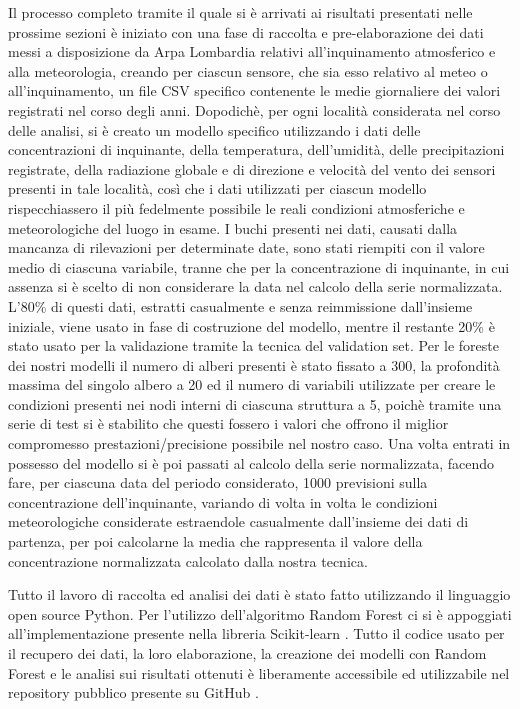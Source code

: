 \documentclass[a4paper,12pt]{report}
\begin{document}
Il processo completo tramite il quale si è arrivati ai risultati presentati nelle prossime sezioni è iniziato con una fase di raccolta e pre-elaborazione dei dati messi a disposizione da Arpa Lombardia relativi all'inquinamento atmosferico e alla meteorologia, creando per ciascun sensore, che sia esso relativo al meteo o all'inquinamento, un file CSV specifico contenente le medie giornaliere dei valori registrati nel corso degli anni. Dopodichè, per ogni località considerata nel corso delle analisi, si è creato un modello specifico utilizzando i dati delle concentrazioni di inquinante, della temperatura, dell'umidità, delle precipitazioni registrate, della radiazione globale e di direzione e velocità del vento dei sensori presenti in tale località, così che i dati utilizzati per ciascun modello rispecchiassero il più fedelmente possibile le reali condizioni atmosferiche e meteorologiche del luogo in esame. I buchi presenti nei dati, causati dalla mancanza di rilevazioni per determinate date, sono stati riempiti con il valore medio di ciascuna variabile, tranne che per la concentrazione di inquinante, in cui assenza si è scelto di non considerare la data nel calcolo della serie normalizzata. L'80\% di questi dati, estratti casualmente e senza reimmissione dall'insieme iniziale, viene usato in fase di costruzione del modello, mentre il restante 20\% è stato usato per la validazione tramite la tecnica del validation set. Per le foreste dei nostri modelli il numero di alberi presenti è stato fissato a 300, la profondità massima del singolo albero a 20 ed il numero di variabili utilizzate per creare le condizioni presenti nei nodi interni di ciascuna struttura a 5, poichè tramite una serie di test si è stabilito che questi fossero i valori che offrono il miglior compromesso prestazioni/precisione possibile nel nostro caso. Una volta entrati in possesso del modello si è poi passati al calcolo della serie normalizzata, facendo fare, per ciascuna data del periodo considerato, 1000 previsioni sulla concentrazione dell'inquinante, variando di volta in volta le condizioni meteorologiche considerate estraendole casualmente dall'insieme dei dati di partenza, per poi calcolarne la media che rappresenta il valore della concentrazione normalizzata calcolato dalla nostra tecnica. 

Tutto il lavoro di raccolta ed analisi dei dati è stato fatto utilizzando il linguaggio open source Python. Per l'utilizzo dell'algoritmo Random Forest ci si è appoggiati all'implementazione presente nella libreria Scikit-learn \cite{scikit-learn}. Tutto il codice usato per il recupero dei dati, la loro elaborazione, la creazione dei modelli con Random Forest e le analisi sui risultati ottenuti è liberamente accessibile ed utilizzabile nel repository pubblico presente su GitHub \cite{belotti2020}.
\end{document}
